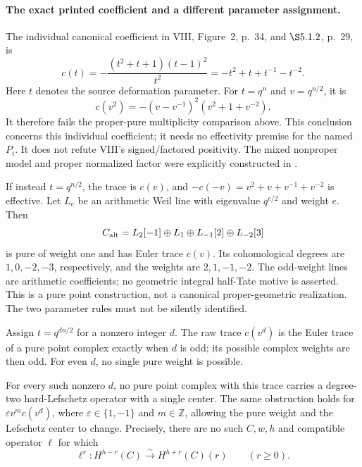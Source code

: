 \paragraph{The exact printed coefficient and a different parameter assignment.}
The individual canonical coefficient in VIII, Figure~2,
p.~34, and \(\S5.1.2\), p.~29, is
\begin{equation}\label{eq:VIIIrawCanonicalCoefficient}
 c(t)=-\frac{(t^2+t+1)(t-1)^2}{t^2}
           =-t^2+t+t^{-1}-t^{-2}.
\end{equation}
Here \(t\) denotes the source deformation parameter.
For \(t=q^n\) and \(v=q^{n/2}\), it is
\[
                    c(v^2)=-(v-v^{-1})^2(v^2+1+v^{-2}).
\]
It therefore fails the proper-pure multiplicity comparison
above. This conclusion concerns this individual coefficient;
it needs no effectivity premise for the named \(P_i\).
It does not refute VIII's signed/factored positivity.
The mixed nonproper model and proper normalized factor
were explicitly constructed in .

If instead \(t=q^{n/2}\), the trace is \(c(v)\), and
\(-c(-v)=v^2+v+v^{-1}+v^{-2}\) is effective.
Let \(L_e\) be an arithmetic Weil line with eigenvalue
\(q^{e/2}\) and weight \(e\). Then
\begin{equation}\label{eq:alternatePureVIIIcoefficient}
 C_{\rm alt}=L_2[-1]\oplus L_1
                      \oplus L_{-1}[2]\oplus L_{-2}[3]
\end{equation}
is pure of weight one and has Euler trace \(c(v)\).
Its cohomological degrees are \(1,0,-2,-3\), respectively,
and the weights are \(2,1,-1,-2\).
The odd-weight lines are arithmetic coefficients; no
geometric integral half-Tate motive is asserted.
This is a pure point construction, not a canonical
proper-geometric realization. The two parameter rules
must not be silently identified.

\begin{finding}
\label{f:canonicalLefschetzBoundary}
Assign \(t=q^{dn/2}\) for a nonzero integer \(d\).
The raw trace \(c(v^d)\) is the Euler trace of a pure
point complex exactly when \(d\) is odd; its possible
complex weights are then odd. For even \(d\), no
single pure weight is possible.

For every such nonzero \(d\), no pure point complex
with this trace carries a degree-two hard-Lefschetz
operator with a single center. The same obstruction
holds for \(\varepsilon v^m c(v^d)\), where
\(\varepsilon\in\{1,-1\}\) and \(m\in\mathbb Z\),
allowing the pure weight and the Lefschetz center to change.
Precisely, there are no such \(C,w,h\) and compatible
operator \(\ell\) for which
\[
 \ell^r:H^{h-r}(C)\xrightarrow{\sim}H^{h+r}(C)(r)
                       \qquad(r\geq0).
\]
\end{finding}

